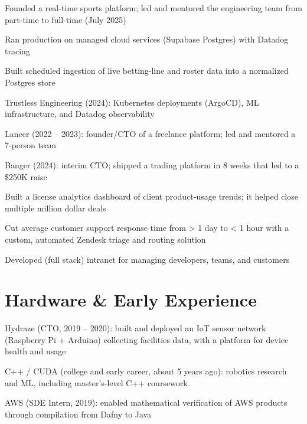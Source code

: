 \documentclass[print]{jack-resume}
\begin{document}
\begin{tightemize}
    \item Founded a real-time sports platform; led and mentored the engineering team from part-time to full-time (July 2025)
    \item Ran production on managed cloud services (Supabase Postgres) with Datadog tracing
    \item Built scheduled ingestion of live betting-line and roster data into a normalized Postgres store
\end{tightemize}
\sectionsep

\begin{tightemize}
    \item Trustless Engineering (2024): Kubernetes deployments (ArgoCD), ML infrastructure, and Datadog observability
    \item Lancer (2022 -- 2023): founder/CTO of a freelance platform; led and mentored a 7-person team
    \item Banger (2024): interim CTO; shipped a trading platform in 8 weeks that led to a \$250K raise
\end{tightemize}
\sectionsep

\begin{tightemize}
    \item Built a license analytics dashboard of client product-usage trends; it helped close multiple million dollar deals
    \item Cut average customer support response time from > 1 day to < 1 hour with a custom, automated Zendesk triage and routing solution
    \item Developed (full stack) intranet for managing developers, teams, and customers
\end{tightemize}
\sectionsep

\section{Hardware \& Early Experience}
\vspace{1.4em}
\begin{tightemize}
    \item Hydraze (CTO, 2019 -- 2020): built and deployed an IoT sensor network (Raspberry Pi + Arduino) collecting facilities data, with a platform for device health and usage
    \item C++ / CUDA (college and early career, about 5 years ago): robotics research and ML, including master's-level C++ coursework
    \item AWS (SDE Intern, 2019): enabled mathematical verification of AWS products through compilation from Dafny to Java
\end{tightemize}
\sectionsep
\end{document}
